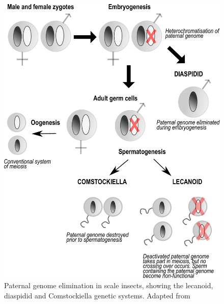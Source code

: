\begin{figure}[H]
	\centering
	\includegraphics[scale = 0.6]{Images/PGE_system.pdf}
	\caption{Paternal genome elimination in scale insects, showing the lecanoid, diaspidid and Comstockiella  genetic systems. Adapted from \citet{Bull1979, Burt2009, Ross2010GenomicSystems}}
	\label{fig:pge}
\end{figure} 

